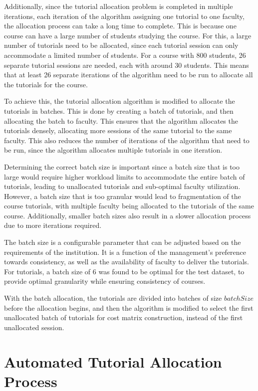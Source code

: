Additionally, since the tutorial allocation problem is completed in multiple iterations, each iteration of the algorithm assigning one tutorial to one faculty, the allocation process can take a long time to complete. This is because one course can have a large number of students studying the course. For this, a large number of tutorials need to be allocated, since each tutorial session can only accommodate a limited number of students. For a course with 800 students, 26 separate tutorial sessions are needed, each with around 30 students. This means that at least 26 separate iterations of the algorithm need to be run to allocate all the tutorials for the course.

To achieve this, the tutorial allocation algorithm is modified to allocate the tutorials in batches. This is done by creating a batch of tutorials, and then allocating the batch to faculty. This ensures that the algorithm allocates the tutorials densely, allocating more sessions of the same tutorial to the same faculty. This also reduces the number of iterations of the algorithm that need to be run, since the algorithm allocates multiple tutorials in one iteration.

Determining the correct batch size is important since a batch size that is too large would require higher workload limits to accommodate the entire batch of tutorials, leading to unallocated tutorials and sub-optimal faculty utilization. However, a batch size that is too granular would lead to fragmentation of the course tutorials, with multiple faculty being allocated to the tutorials of the same course. Additionally, smaller batch sizes also result in a slower allocation process due to more iterations required.

The batch size is a configurable parameter that can be adjusted based on the requirements of the institution. It is a function of the management's preference towards consistency, as well as the availability of faculty to deliver the tutorials. For tutorials, a batch size of 6 was found to be optimal for the test dataset, to provide optimal granularity while ensuring consistency of courses.

With the batch allocation, the tutorials are divided into batches of size $batchSize$ before the allocation begins, and then the algorithm is modified to select the first unallocated batch of tutorials for cost matrix construction, instead of the first unallocated session.


\section{Automated Tutorial Allocation Process}

